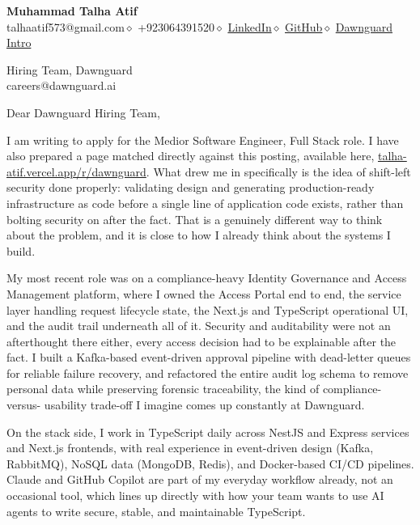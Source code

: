\documentclass[10pt, letterpaper]{article}
\begin{document}
\pagestyle{empty}

{\Large\bfseries\color{navy} Muhammad Talha Atif}\\[2pt]
{\small\color{lightgray}
  talhaatif573@gmail.com\enspace$\diamond$\enspace
  +923064391520\enspace$\diamond$\enspace
  \href{https://linkedin.com/in/muhammad-talha-atif}{LinkedIn}\enspace$\diamond$\enspace
  \href{https://github.com/M-Talha-Atif}{GitHub}\enspace$\diamond$\enspace
  \href{https://talha-atif.vercel.app/r/dawnguard}{Dawnguard Intro}}

\vspace{14pt}

{\small\color{medgray} Hiring Team, Dawnguard}\\
{\small\color{medgray} careers@dawnguard.ai}

\vspace{14pt}

Dear Dawnguard Hiring Team,

I am writing to apply for the Medior Software Engineer, Full Stack role. I have also prepared
a page matched directly against this posting, available here,
\href{https://talha-atif.vercel.app/r/dawnguard}{talha-atif.vercel.app/r/dawnguard}. What drew me in
specifically is the idea of shift-left security done properly: validating design and generating
production-ready infrastructure as code before a single line of application code exists, rather
than bolting security on after the fact. That is a genuinely different way to think about the
problem, and it is close to how I already think about the systems I build.

My most recent role was on a compliance-heavy Identity Governance and Access Management
platform, where I owned the Access Portal end to end, the service layer handling request
lifecycle state, the Next.js and TypeScript operational UI, and the audit trail underneath all
of it. Security and auditability were not an afterthought there either, every access decision
had to be explainable after the fact. I built a Kafka-based event-driven approval pipeline with
dead-letter queues for reliable failure recovery, and refactored the entire audit log schema to
remove personal data while preserving forensic traceability, the kind of compliance-versus-
usability trade-off I imagine comes up constantly at Dawnguard.

On the stack side, I work in TypeScript daily across NestJS and Express services and Next.js
frontends, with real experience in event-driven design (Kafka, RabbitMQ), NoSQL data (MongoDB,
Redis), and Docker-based CI/CD pipelines. Claude and GitHub Copilot are part of my everyday
workflow already, not an occasional tool, which lines up directly with how your team wants to
use AI agents to write secure, stable, and maintainable TypeScript.
\end{document}
